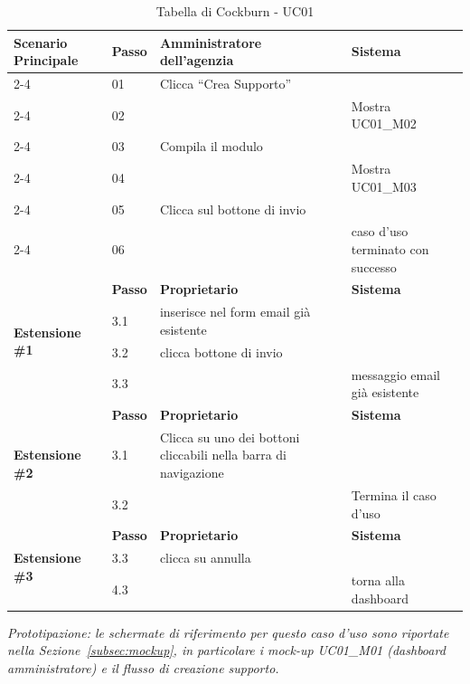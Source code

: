 \documentclass[a4paper,11pt]{article}
\begin{document}
\begin{table}[htbp]
\begin{tabular}{|p{3cm}|l|p{4.5cm}|p{4.5cm}|}
\hline
\multirow{6}{3cm}{\textbf{Scenario Principale}} 
   & \textbf{Passo} & \textbf{Amministratore dell'agenzia} & \textbf{Sistema} \\ \cline{2-4}
   & 01 & Clicca ``Crea Supporto'' & \\ \cline{2-4}
   & 02 & & Mostra UC01\_M02 \\ \cline{2-4}
   & 03 & Compila il modulo & \\ \cline{2-4}
   & 04 & & Mostra UC01\_M03 \\ \cline{2-4}
   & 05 & Clicca sul bottone di invio & \\ \cline{2-4}
   & 06 & & caso d'uso terminato con successo \\ \hline
\multirow{4}{3cm}{\textbf{Estensione \#1}} 
   & \textbf{Passo} & \textbf{Proprietario} & \textbf{Sistema} \\ \cline{2-4}
   & 3.1 & inserisce nel form email già esistente & \\ \cline{2-4}
   & 3.2 & clicca bottone di invio &  \\ \hline
   & 3.3 & & messaggio email già esistente \\ \hline
\multirow{3}{3cm}{\textbf{Estensione \#2}} 
   & \textbf{Passo} & \textbf{Proprietario} & \textbf{Sistema} \\ \cline{2-4}
   & 3.1 & Clicca su uno dei bottoni \newline cliccabili nella barra di navigazione
 & \\ \cline{2-4}
   & 3.2 & & Termina il caso d’uso \\ \hline
   \multirow{3}{3cm}{\textbf{Estensione \#3}} 
   & \textbf{Passo} & \textbf{Proprietario} & \textbf{Sistema} \\ \cline{2-4}
   & 3.3 & clicca su annulla & \\ \cline{2-4}
   & 4.3 & & torna alla dashboard \\ \hline
   
\end{tabular}

\caption{Tabella di Cockburn - UC01}
\end{table}
\smallskip
\noindent\textit{Prototipazione: le schermate di riferimento per questo caso d'uso sono riportate nella Sezione~\ref{subsec:mockup}, in particolare i mock-up UC01\_M01 (dashboard amministratore) e il flusso di creazione supporto.}
\end{document}
